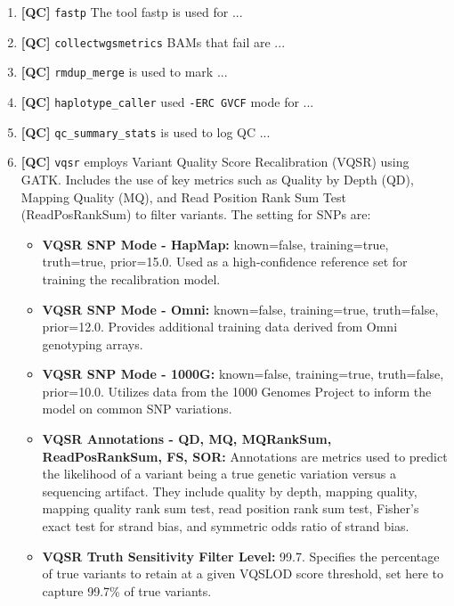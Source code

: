 \begin{tcolorbox}[
    breakable,  %
    colback=white!0,  %
    colframe=black,  %
    boxrule=1pt,  %
    arc=1mm,  %
    outer arc=1mm,
         title=\textbf{\refstepcounter{myboxcounter}\label{box:qv_description_example}Box \themyboxcounter: Example QV description file (highlighting VQSR steps)}
]

\begin{enumerate}
    \item \textbf{[QC]} \colorbox{kispiblue!30}{\texttt{fastp}} The tool fastp is used for ...
    \item \textbf{[QC]} \colorbox{kispiblue!30}{\texttt{collectwgsmetrics}} BAMs that fail are ...
    \item \textbf{[QC]} \colorbox{kispiblue!30}{\texttt{rmdup\_merge}} is used to mark ...
    \item \textbf{[QC]} \colorbox{kispiblue!30}{\texttt{haplotype\_caller}} used \texttt{-ERC GVCF} mode for ...
    \item \textbf{[QC]} \colorbox{kispiblue!30}{\texttt{qc\_summary\_stats}} is used to log QC ...
    \item \textbf{[QC]} \colorbox{kispiblue!30}{\texttt{vqsr}} employs Variant Quality Score Recalibration (VQSR) using GATK. Includes the use of key metrics such as Quality by Depth (QD), Mapping Quality (MQ), and Read Position Rank Sum Test (ReadPosRankSum) to filter variants. The setting for SNPs are:
\begin{itemize}
    \item \textbf{VQSR SNP Mode - HapMap:} known=false, training=true, truth=true, prior=15.0. Used as a high-confidence reference set for training the recalibration model.
    \item \textbf{VQSR SNP Mode - Omni:} known=false, training=true, truth=false, prior=12.0. Provides additional training data derived from Omni genotyping arrays.
    \item \textbf{VQSR SNP Mode - 1000G:} known=false, training=true, truth=false, prior=10.0. Utilizes data from the 1000 Genomes Project to inform the model on common SNP variations.
    \item \textbf{VQSR Annotations - QD, MQ, MQRankSum, ReadPosRankSum, FS, SOR:} Annotations are metrics used to predict the likelihood of a variant being a true genetic variation versus a sequencing artifact. They include quality by depth, mapping quality, mapping quality rank sum test, read position rank sum test, Fisher's exact test for strand bias, and symmetric odds ratio of strand bias.
    \item \textbf{VQSR Truth Sensitivity Filter Level:} 99.7. Specifies the percentage of true variants to retain at a given VQSLOD score threshold, set here to capture 99.7\% of true variants.
    \end{itemize}    
\end{enumerate}
\end{tcolorbox}

